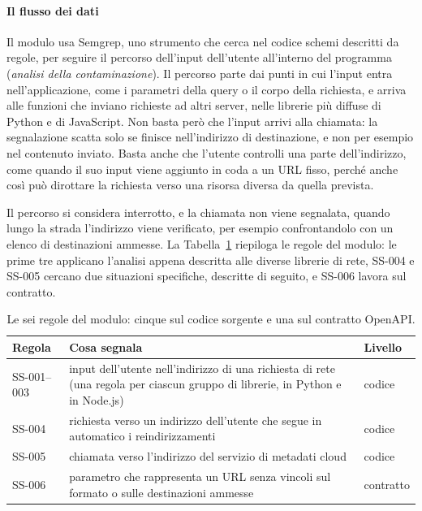 \paragraph{Il flusso dei dati}
Il modulo usa Semgrep, uno strumento che cerca nel codice schemi descritti da
regole, per seguire il percorso dell'input dell'utente all'interno del
programma (\emph{analisi della contaminazione}). Il percorso parte dai punti
in cui l'input entra nell'applicazione, come i parametri della query o il corpo
della richiesta, e arriva alle funzioni che inviano richieste ad altri server,
nelle librerie più diffuse di Python e di JavaScript. Non basta però che
l'input arrivi alla chiamata: la segnalazione scatta solo se finisce
nell'indirizzo di destinazione, e non per esempio nel contenuto inviato. Basta
anche che l'utente controlli una parte dell'indirizzo, come quando il suo input
viene aggiunto in coda a un URL fisso, perché anche così può dirottare la
richiesta verso una risorsa diversa da quella prevista.

Il percorso si considera interrotto, e la chiamata non viene segnalata, quando
lungo la strada l'indirizzo viene verificato, per esempio confrontandolo con un
elenco di destinazioni ammesse. La Tabella~\ref{tab:regole-ssrf} riepiloga le
regole del modulo: le prime tre applicano l'analisi appena descritta alle
diverse librerie di rete, SS-004 e SS-005 cercano due situazioni specifiche,
descritte di seguito, e SS-006 lavora sul contratto.

\begin{table}[htbp]
  \centering
  \small
  \linespread{1.0}\selectfont
  \renewcommand{\arraystretch}{1.15}
  \begin{tabularx}{\linewidth}{@{}l X l@{}}
    \toprule
    \textbf{Regola} & \textbf{Cosa segnala} & \textbf{Livello} \\
    \midrule
    SS-001--003 & input dell'utente nell'indirizzo di una richiesta di rete (una
    regola per ciascun gruppo di librerie, in Python e in Node.js) & codice \\
    SS-004 & richiesta verso un indirizzo dell'utente che segue in automatico i
    reindirizzamenti & codice \\
    SS-005 & chiamata verso l'indirizzo del servizio di metadati cloud & codice \\
    SS-006 & parametro che rappresenta un URL senza vincoli sul formato o sulle
    destinazioni ammesse & contratto \\
    \bottomrule
  \end{tabularx}
  \caption[Regole del modulo Server-Side Request Forgery]{Le sei regole del
  modulo: cinque sul codice sorgente e una sul contratto OpenAPI.}
  \label{tab:regole-ssrf}
\end{table}

